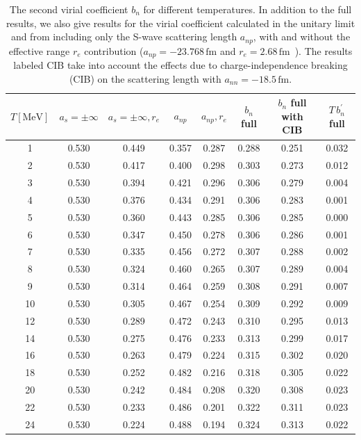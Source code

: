 \documentclass[aps,prc,twocolumn,showpacs,showkeys,amsmath,amssymb]{revtex4}
\newcommand{\as}{a_s}
\newcommand{\re}{r_e}
\newcommand{\fm}{\, \text{fm}}
\begin{document}
\begin{table}
\caption{The second virial coefficient $b_n$ for different temperatures. 
In addition to the full results, we also give results for the virial 
coefficient calculated in the unitary limit and from including only 
the S-wave scattering length $a_{np}$, with and without the effective 
range $\re$ contribution 
($a_{np} = -23.768 \fm$ and $\re = 2.68 \fm$~\cite{effrange}).
The results labeled CIB take into account the effects due to
charge-independence breaking (CIB) on the scattering length with 
$a_{nn} = -18.5 \fm$.}
\label{Table1}
\begin{ruledtabular}
\begin{tabular}{c|ccccccc}
$T [\text{MeV}]$ & $\as = \pm \infty$ & $\as = \pm \infty, \re$ &
$a_{np}$ & $a_{np}, \re$ & $b_n$ full & $b_n$ full with CIB & 
$T \, b_n^\prime$ full \\[0.2mm] \hline
 1 & 0.530 & 0.449 & 0.357 & 0.287 & 0.288 & 0.251 & 0.032 \\[0.2mm]
 2 & 0.530 & 0.417 & 0.400 & 0.298 & 0.303 & 0.273 & 0.012 \\[0.2mm]
 3 & 0.530 & 0.394 & 0.421 & 0.296 & 0.306 & 0.279 & 0.004 \\[0.2mm]
 4 & 0.530 & 0.376 & 0.434 & 0.291 & 0.306 & 0.283 & 0.001 \\[0.2mm]
 5 & 0.530 & 0.360 & 0.443 & 0.285 & 0.306 & 0.285 & 0.000 \\[0.2mm]
 6 & 0.530 & 0.347 & 0.450 & 0.278 & 0.306 & 0.286 & 0.001 \\[0.2mm]
 7 & 0.530 & 0.335 & 0.456 & 0.272 & 0.307 & 0.288 & 0.002 \\[0.2mm]
 8 & 0.530 & 0.324 & 0.460 & 0.265 & 0.307 & 0.289 & 0.004 \\[0.2mm]
 9 & 0.530 & 0.314 & 0.464 & 0.259 & 0.308 & 0.291 & 0.007 \\[0.2mm]
10 & 0.530 & 0.305 & 0.467 & 0.254 & 0.309 & 0.292 & 0.009 \\[0.2mm]
12 & 0.530 & 0.289 & 0.472 & 0.243 & 0.310 & 0.295 & 0.013 \\[0.2mm]
14 & 0.530 & 0.275 & 0.476 & 0.233 & 0.313 & 0.299 & 0.017 \\[0.2mm]
16 & 0.530 & 0.263 & 0.479 & 0.224 & 0.315 & 0.302 & 0.020 \\[0.2mm]
18 & 0.530 & 0.252 & 0.482 & 0.216 & 0.318 & 0.305 & 0.022 \\[0.2mm]
20 & 0.530 & 0.242 & 0.484 & 0.208 & 0.320 & 0.308 & 0.023 \\[0.2mm]
22 & 0.530 & 0.233 & 0.486 & 0.201 & 0.322 & 0.311 & 0.023 \\[0.2mm]
24 & 0.530 & 0.224 & 0.488 & 0.194 & 0.324 & 0.313 & 0.022 \\
\end{tabular} 
\end{ruledtabular}
\end{table}
\end{document}
